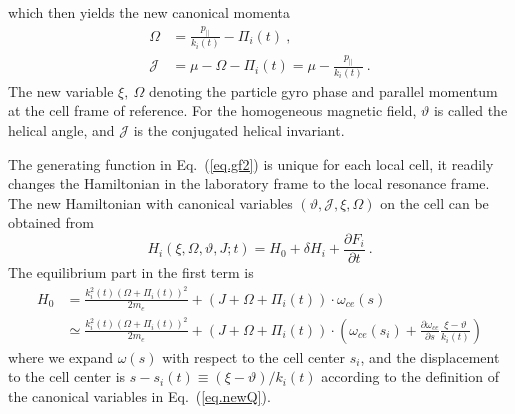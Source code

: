 which then yields the new canonical momenta
\begin{equation}\label{eq.newP}
    \begin{aligned}
        \Omega & = \frac{p_{\|}}{k_{i}(t)}-\Pi_{i}(t)~,
        \\
        \mathcal{J}   & = \mu-\Omega-\Pi_{i}(t)=\mu-\frac{p_{\|}}{k_{i}(t)}~.
    \end{aligned}
\end{equation}
The new variable $\xi,~\Omega$ denoting the particle gyro phase and parallel momentum at the cell frame of reference.
For the homogeneous magnetic field, $\vartheta$ is called the helical angle, and $\mathcal{J}$ is the conjugated helical invariant.

The generating function in Eq.~(\ref{eq.gf2}) is unique for each local cell, it readily changes the Hamiltonian in the laboratory frame to the local resonance frame.
The new Hamiltonian with canonical variables $(\vartheta,\mathcal{J},\xi,\Omega)$ on the cell can be obtained from 
\begin{equation}\label{eq.HamiltonianK}
    H_{i} (\xi, \Omega, \vartheta, J ; t)=H_{0}+ \delta H_i+\frac{\partial F_{i}}{\partial t}~.
\end{equation}
The equilibrium part in the first term is 
\begin{equation}\label{eq.ctH0}
    \begin{aligned}
     H_0 &= \frac{k_{i}^{2}(t)\left(\Omega+\Pi_{i}(t)\right)^{2}}{2 m_{e}}+\left(J+\Omega+\Pi_{i}(t)\right) \cdot \omega_{c e}(s) 
     \\
        & \simeq \frac{k_{i}^{2}(t)\left(\Omega+\Pi_{i}(t)\right)^{2}}{2 m_{e}}+\left(J+\Omega+\Pi_{i}(t)\right) \cdot \left(\omega_{c e}(s_i) +  \frac{\partial \omega_{ce}}{\partial s} \frac{\xi - \vartheta}{k_i(t)}\right)
    \end{aligned}
\end{equation}
where we expand $\omega(s)$ with respect to the cell center $s_i$, and the displacement to the cell center is $s - s_{i}(t) \equiv (\xi-\vartheta)/k_{i}(t)$ according to the definition of the canonical variables in Eq.~(\ref{eq.newQ}). 

